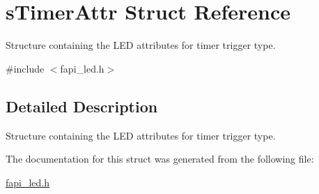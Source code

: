 \hypertarget{structsTimerAttr}{\section{s\-Timer\-Attr Struct Reference}
\label{structsTimerAttr}
}


Structure containing the L\-E\-D attributes for timer trigger type.  




{\ttfamily \#include $<$fapi\-\_\-led.\-h$>$}



\subsection{Detailed Description}
Structure containing the L\-E\-D attributes for timer trigger type. 



The documentation for this struct was generated from the following file\-:\begin{DoxyCompactItemize}
\item 
\hyperlink{fapi__led_8h}{fapi\-\_\-led.\-h}\end{DoxyCompactItemize}
